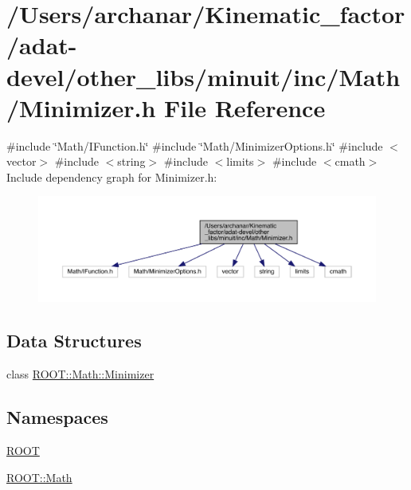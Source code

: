 \hypertarget{adat-devel_2other__libs_2minuit_2inc_2Math_2Minimizer_8h}{}\section{/\+Users/archanar/\+Kinematic\+\_\+factor/adat-\/devel/other\+\_\+libs/minuit/inc/\+Math/\+Minimizer.h File Reference}
\label{adat-devel_2other__libs_2minuit_2inc_2Math_2Minimizer_8h}
{\ttfamily \#include \char`\"{}Math/\+I\+Function.\+h\char`\"{}}\newline
{\ttfamily \#include \char`\"{}Math/\+Minimizer\+Options.\+h\char`\"{}}\newline
{\ttfamily \#include $<$vector$>$}\newline
{\ttfamily \#include $<$string$>$}\newline
{\ttfamily \#include $<$limits$>$}\newline
{\ttfamily \#include $<$cmath$>$}\newline
Include dependency graph for Minimizer.\+h\+:
\nopagebreak
\begin{figure}[H]
\begin{center}
\leavevmode
\includegraphics[width=350pt]{d4/d87/adat-devel_2other__libs_2minuit_2inc_2Math_2Minimizer_8h__incl}
\end{center}
\end{figure}
\subsection*{Data Structures}
\begin{DoxyCompactItemize}
\item 
class \mbox{\hyperlink{classROOT_1_1Math_1_1Minimizer}{R\+O\+O\+T\+::\+Math\+::\+Minimizer}}
\end{DoxyCompactItemize}
\subsection*{Namespaces}
\begin{DoxyCompactItemize}
\item 
 \mbox{\hyperlink{namespaceROOT}{R\+O\+OT}}
\item 
 \mbox{\hyperlink{namespaceROOT_1_1Math}{R\+O\+O\+T\+::\+Math}}
\end{DoxyCompactItemize}
